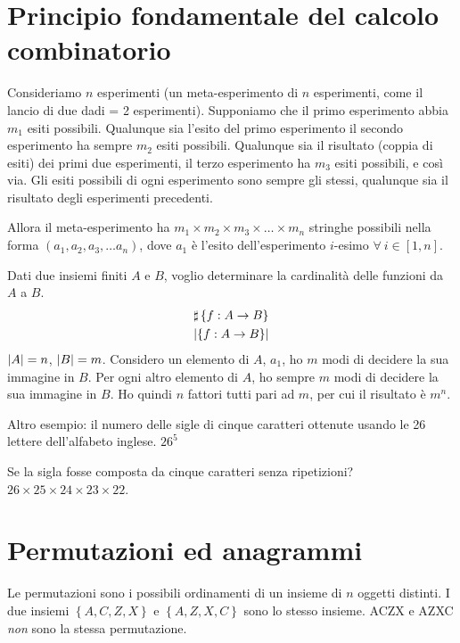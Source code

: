 \section{Principio fondamentale del calcolo combinatorio}

\begin{theorem}
Consideriamo $n$ esperimenti (un meta-esperimento di $n$ esperimenti, come il lancio di due dadi = 2 esperimenti). Supponiamo che il primo esperimento abbia $m_1$ esiti possibili. Qualunque sia l'esito del primo esperimento il secondo esperimento ha sempre $m_2$ esiti possibili. Qualunque sia il risultato (coppia di esiti) dei primi due esperimenti, il terzo esperimento ha $m_3$ esiti possibili, e cos\`i via. Gli esiti possibili di ogni esperimento sono sempre gli stessi, qualunque sia il risultato degli esperimenti precedenti.

Allora il meta-esperimento ha $ m_1 \times m_2 \times m_3 \times \dots \times m_n $ stringhe possibili nella forma $( a_1, a_2, a_3, \dots a_n)$, dove $a_1$ \`e l'esito dell'esperimento $i$-esimo $\forall \ i \in [1, n]$.
\end{theorem}

Dati due insiemi finiti $A$ e $B$, voglio determinare la cardinalit\`a delle funzioni da $A$ a $B$.
\begin{gather*}
\sharp \left\{ f: A \to B \right\} \\
\left\lvert{\left\{ f: A \to B \right\}}\right\rvert
\end{gather*}
$\left\lvert{A}\right\rvert = n$, $\left\lvert{B}\right\rvert = m$. Considero un elemento di $A$, $a_1$, ho $m$ modi di decidere la sua immagine in $B$. Per ogni altro elemento di $A$, ho sempre $m$ modi di decidere la sua immagine in $B$. Ho quindi $n$ fattori tutti pari ad $m$, per cui il risultato \`e $m^n$.

Altro esempio: il numero delle sigle di cinque caratteri ottenute usando le 26 lettere dell'alfabeto inglese. $26^5$

Se la sigla fosse composta da cinque caratteri senza ripetizioni? $26 \times 25 \times 24 \times 23 \times 22$.

\section{Permutazioni ed anagrammi}

Le permutazioni sono i possibili ordinamenti di un insieme di $n$ oggetti distinti. I due insiemi $ \left\{ A, C, Z, X \right\}$ e $ \left\{ A, Z, X, C \right\} $ sono lo stesso insieme. ACZX e AZXC \textit{non} sono la stessa permutazione.

